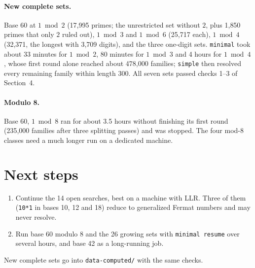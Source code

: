 \documentclass[11pt]{article}
\newcommand{\code}[1]{\texttt{#1}}
\begin{document}
\paragraph{New complete sets.} Base 60 at $1 \bmod 2$ (17{,}995 primes; the unrestricted set without $2$, plus 1{,}850 primes that only $2$ ruled out), $1 \bmod 3$ and $1 \bmod 6$ (25{,}717 each), $1 \bmod 4$ (32{,}371, the longest with 3{,}709 digits), and the three one-digit sets. \code{minimal} took about 33 minutes for $1 \bmod 2$, 80 minutes for $1 \bmod 3$ and 4 hours for $1 \bmod 4$, whose first round alone reached about 478{,}000 families; \code{simple} then resolved every remaining family within length 300. All seven sets passed checks 1--3 of Section~4.

\paragraph{Modulo 8.} Base 60, $1 \bmod 8$ ran for about 3.5 hours without finishing its first round (235{,}000 families after three splitting passes) and was stopped. The four mod-8 classes need a much longer run on a dedicated machine.

\section{Next steps}

\begin{enumerate}[label=\arabic*.]
\item Continue the 14 open searches, best on a machine with LLR. Three of them (\code{10*1} in bases 10, 12 and 18) reduce to generalized Fermat numbers and may never resolve.
\item Run base 60 modulo 8 and the 26 growing sets with \code{minimal resume} over several hours, and base 42 as a long-running job.
\end{enumerate}
New complete sets go into \code{data-computed/} with the same checks.
\end{document}
